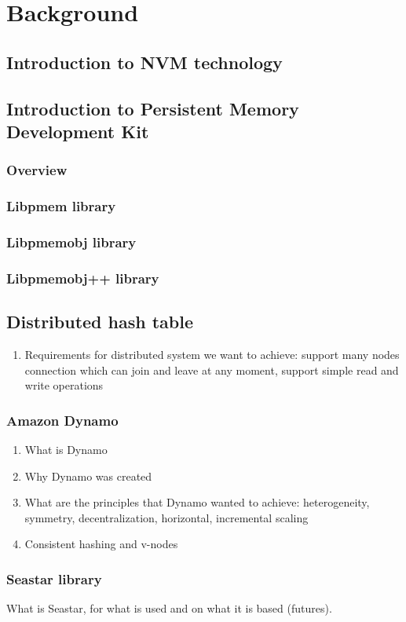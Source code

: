 \chapter{Background}

\section{Introduction to NVM technology}
\section{Introduction to Persistent Memory Development Kit}
\subsection{Overview}
\subsection{Libpmem library}
\subsection{Libpmemobj library}
\subsection{Libpmemobj++ library}

\section{Distributed hash table} %
\begin{enumerate}
    \item Requirements for distributed system we want to achieve: support many nodes connection which can join and leave at any moment, support simple read and write operations
\end{enumerate}

\subsection{Amazon Dynamo}
\begin{enumerate}
    \item What is Dynamo
    \item Why Dynamo was created 
    \item What are the principles that Dynamo wanted to achieve: heterogeneity, symmetry, decentralization, horizontal, incremental scaling 
    \item Consistent hashing and v-nodes
\end{enumerate}

\subsection{Seastar library}
What is Seastar, for what is used and on what it is based (futures). 